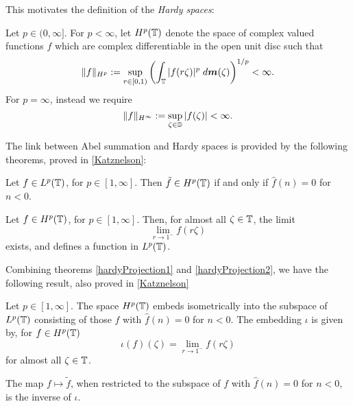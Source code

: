This motivates the definition of the \emph{Hardy spaces}:
\begin{definition}
    Let $p \in (0,\infty]$. For $p < \infty$, let $H^p(\mathbb{T})$ denote the space
    of complex valued functions $f$ which are complex differentiable in the open unit disc
    such that
    \begin{equation}
        \|f\|_{H^p} := \sup_{r \in [0,1)} \left(\int_{\mathbb{T}} |f(r\zeta)|^p \;d\boldsymbol{m}(\zeta)\right)^{1/p} < \infty.
    \end{equation}
    For $p = \infty$, instead we require
    \begin{equation*}
        \|f\|_{H^\infty} := \sup_{\zeta \in \mathbb{D}} |f(\zeta)| < \infty.
    \end{equation*}
\end{definition}

The link between Abel summation and Hardy spaces is provided by the following theorems,
proved in \ref{Katznelson}:
\begin{theorem}
\label{hardyProjection1}
    Let $f \in L^p(\mathbb{T})$, for $p \in [1,\infty]$. Then $\tilde{f} \in H^p(\mathbb{T})$
    if and only if $\hat{f}(n) = 0$ for $n < 0$.
\end{theorem}
\begin{theorem}
\label{hardyProjection2}
    Let $f \in H^p(\mathbb{T})$, for $p \in [1,\infty]$. Then, for almost all $\zeta \in \mathbb{T}$,
    the limit
    \begin{equation*}
        \lim_{r\to 1^-} f(r\zeta)
    \end{equation*}
    exists, and defines a function in $L^p(\mathbb{T})$.
\end{theorem}

Combining theorems \ref{hardyProjection1} and \ref{hardyProjection2}, we 
have the following result, also proved in \ref{Katznelson}
\begin{theorem}
    Let $p \in [1,\infty]$. The space $H^p(\mathbb{T})$ embeds
    isometrically into the subspace of $L^p(\mathbb{T})$
    consisting of those $f$ with $\hat{f}(n) = 0$ for $n < 0$. The embedding $\iota$
    is given by, for $f \in H^p(\mathbb{T})$
    \begin{equation}
        \iota(f)(\zeta) = \lim_{r\to 1^-} f(r\zeta)
    \end{equation}
    for almost all $\zeta \in \mathbb{T}$.
    
    The map $f\mapsto \tilde{f}$, when restricted to the subspace
    of $f$ with $\hat{f}(n) = 0$ for $n < 0$, is the inverse of $\iota$.
\end{theorem}

